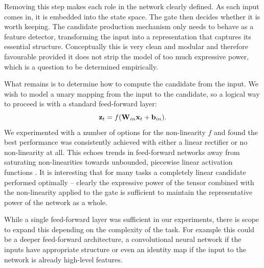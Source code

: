 Removing this step makes each role in the network clearly defined. As each input comes in, it is
embedded into the state space. The gate then decides whether it is worth keeping.
The candidate production mechanism only needs to behave as a feature
detector, transforming the input into a representation that captures its essential structure.
Conceptually this is very clean and modular and therefore favourable provided it does not strip
the model of too much expressive power, which is a question to be determined empirically.
%

What remains is to determine how to compute the candidate from the input. We wish to model a unary
mapping from the input to the candidate, so a logical way to proceed is with a standard feed-forward
layer:
\begin{equation}\label{eq:propcandidate}
	\mathbf{z}_t = f(\mathbf{W}_{in}\mathbf{x}_t + \mathbf{b}_{in}).
\end{equation} We experimented with a number of options for the non-linearity \(f\) and found the best
performance was consistently achieved with either a linear rectifier or no
non-linearity at all. This echoes trends in feed-forward networks away from saturating non-linearities
towards unbounded, piecewise linear activation functions \autocite{Goodfellow2013, He}. It is
interesting that for many tasks a completely linear candidate performed optimally -- clearly the
expressive power of the tensor combined with the non-linearity applied to the gate is sufficient to
maintain the representative power of the network as a whole.

While a single feed-forward layer was sufficient in our experiments, there is scope to expand this
depending on the complexity of the task. For example this could be a deeper feed-forward architecture,
a convolutional neural network if the inputs have appropriate structure or even an identity map if the
input to the network is already high-level features.

